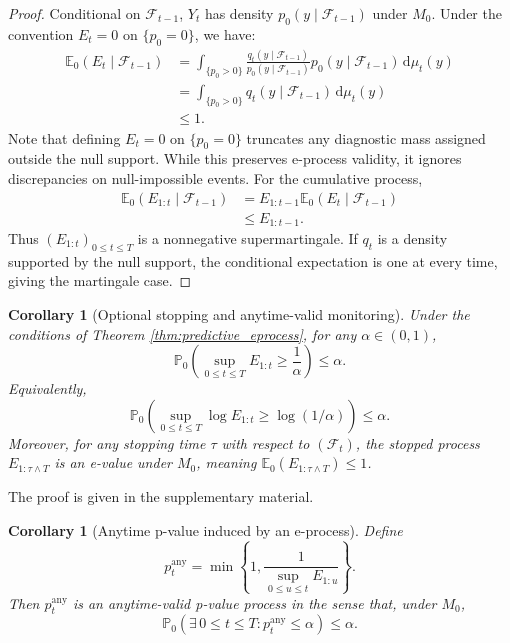 \documentclass[pdflatex,sn-basic]{sn-jnl}
\theoremstyle{thmstyleone}
\newtheorem{corollary}[theorem]{Corollary}
\theoremstyle{thmstyletwo}
\theoremstyle{thmstylethree}
\newcommand{\E}{\mathbb E}
\newcommand{\Pbb}{\mathbb P}
\newcommand{\1}{\mathbf 1}
\newcommand{\calF}{\mathcal F}
\newcommand{\dd}{\,\mathrm d}
\begin{document}
\begin{proof}
Conditional on $\calF_{t-1}$, $Y_t$ has density $p_0(y\mid\calF_{t-1})$ under $M_0$. Under the convention $E_t = 0$ on $\{p_0 = 0\}$, we have:
\begin{align}
\E_0(E_t\mid\calF_{t-1})
&=\int_{\{p_0>0\}}\frac{q_t(y\mid\calF_{t-1})}{p_0(y\mid\calF_{t-1})}p_0(y\mid\calF_{t-1})\dd\mu_t(y)\\
&=\int_{\{p_0>0\}}q_t(y\mid\calF_{t-1})\dd\mu_t(y)\\
&\leq 1.
\end{align}
Note that defining $E_t = 0$ on $\{p_0 = 0\}$ truncates any diagnostic mass assigned outside the null support. While this preserves e-process validity, it ignores discrepancies on null-impossible events. For the cumulative process,
\begin{align}
\E_0(E_{1:t}\mid\calF_{t-1})
&=E_{1:t-1}\E_0(E_t\mid\calF_{t-1})\\
&\leq E_{1:t-1}.
\end{align}
Thus $(E_{1:t})_{0\le t\le T}$ is a nonnegative supermartingale. If $q_t$ is a density supported by the null support, the conditional expectation is one at every time, giving the martingale case.
\end{proof}

\begin{corollary}[Optional stopping and anytime-valid monitoring]
\label{cor:optional_stopping}
Under the conditions of Theorem \ref{thm:predictive_eprocess}, for any $\alpha\in(0,1)$,
\begin{equation}
 \Pbb_0\left(\sup_{0\leq t\leq T}E_{1:t}\geq \frac{1}{\alpha}\right)\leq \alpha.
\end{equation}
Equivalently,
\begin{equation}
 \Pbb_0\left(\sup_{0\leq t\leq T}\log E_{1:t}\geq \log(1/\alpha)\right)\leq \alpha.
\end{equation}
Moreover, for any stopping time $\tau$ with respect to $(\calF_t)$, the stopped process $E_{1:\tau\wedge T}$ is an e-value under $M_0$, meaning $\E_0(E_{1:\tau\wedge T})\leq1$.
\end{corollary}

\noindent The proof is given in the supplementary material.

\begin{corollary}[Anytime p-value induced by an e-process]
\label{cor:anytime_p}
Define
\begin{equation}
 p_t^\mathrm{any}=\min\left\{1,\frac{1}{\sup_{0\leq u\leq t}E_{1:u}}\right\}.
\end{equation}
Then $p_t^\mathrm{any}$ is an anytime-valid p-value process in the sense that, under $M_0$,
\begin{equation}
 \Pbb_0\left(\exists \, 0 \le t \le T: p_t^\mathrm{any}\leq\alpha\right)\leq\alpha.
\end{equation}
\end{corollary}
\end{document}
